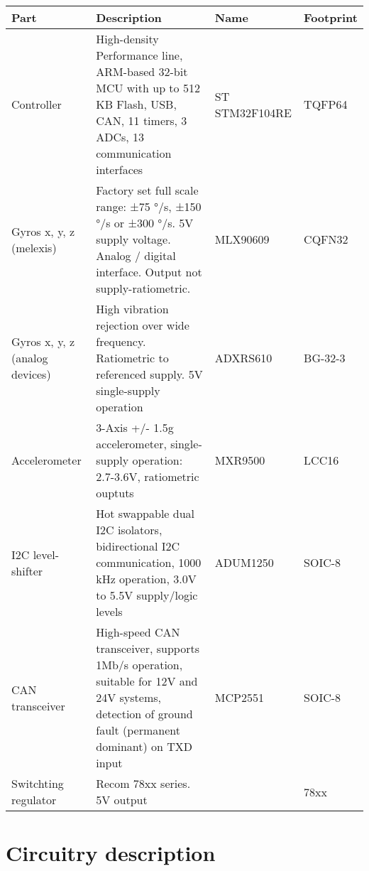 \documentclass[11pt, a4paper]{article}
\begin{document}
\begin{center}\footnotesize

  \begin{tabular}{ | l | p{6.5cm} | l | l |}
    \hline Part & Description & Name & Footprint \\ \hline
    Controller & 
    High-density Performance line, ARM-based 32-bit MCU with up to 512 KB Flash, USB, CAN, 
    11 timers, 3 ADCs, 13 communication interfaces & 
    ST STM32F104RE & 
    TQFP64 \\ \hline

    Gyros x, y, z (melexis) & 
    Factory set full scale range: ±75 °/s, ±150 °/s or ±300 °/s. 5V supply
    voltage. Analog / digital interface. Output not supply-ratiometric. &
    MLX90609 &
    CQFN32 \\ \hline

    Gyros x, y, z (analog devices) &
    High vibration rejection over wide frequency. Ratiometric to referenced supply. 5V single-supply
    operation &
    ADXRS610 &
    BG-32-3 \\ \hline

    Accelerometer &
    3-Axis +/- 1.5g accelerometer, single-supply operation: 2.7-3.6V, ratiometric ouptuts &
    MXR9500 &
    LCC16 \\ \hline

    I2C level-shifter &
    Hot swappable dual I2C isolators, bidirectional I2C communication, 1000 kHz operation, 3.0V to
    5.5V supply/logic levels &
    ADUM1250 &
    SOIC-8 \\ \hline

    CAN transceiver &
    High-speed CAN transceiver, supports 1Mb/s operation, suitable for 12V and 24V systems,
    detection of ground fault (permanent dominant) on TXD input &
    MCP2551 &
    SOIC-8 \\ \hline

    Switchting regulator &
    Recom 78xx series. 5V output &
    &
    78xx \\ \hline
  \end{tabular}
\end{center}



\section{Circuitry description} %
\label{sec:Circuitry description}
\end{document}
